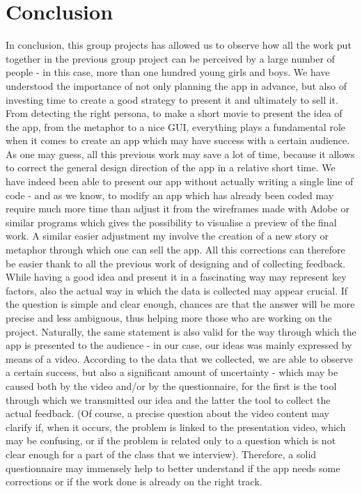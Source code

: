 \documentclass[12pt]{scrartcl}
\begin{document}
			
\section{Conclusion}

	
	In conclusion, this group projects has allowed us to observe how all the work put together in the previous group project can be perceived by a large number of people - in this case, more than one hundred young girls and boys. We have understood the importance of not only planning the app in advance, but also of investing time to create a good strategy to present it and ultimately to sell it. From detecting the right persona, to make a short movie to present the idea of the app, from the metaphor to a nice GUI, everything plays a fundamental role when it comes to create an app which may have success with a certain audience. As one may guess, all this previous work may save a lot of time, because it allows to correct the general design direction of the app in a relative short time. We have indeed been able to present our app without actually writing a single line of code - and as we know, to modify an app which has already been coded may require much more time than adjust it from the wireframes made with Adobe or similar programs which gives the possibility to visualise a preview of the final work. A similar easier adjustment my involve the creation of a new story or metaphor through which one can sell the app. All this corrections can therefore be easier thank to all the previous work of designing and of collecting feedback.\\
	
	While having a good idea and present it in a fascinating way may represent key factors, also the actual way in which the data is collected may appear crucial. If the question is simple and clear enough, chances are that the answer will be more precise and less ambiguous, thus helping more those who are working on the project. Naturally, the same statement is also valid for the way through which the app is presented to the audience - in our case, our ideas was mainly expressed by means of a video. According to the data that we collected, we are able to observe a certain success, but also a significant amount of uncertainty - which may be caused both by the video and/or by the questionnaire, for the first is the tool through which we transmitted our idea and the latter the tool to collect the actual feedback. (Of course, a precise question about the video content may clarify if, when it occurs, the problem is linked to the presentation video, which may be confusing, or if the problem is related only to a question which is not clear enough for a part of the class that we interview). Therefore, a solid questionnaire may immensely help to better understand if the app needs some corrections or if the work done is already on the right track.\\
  
\end{document}
